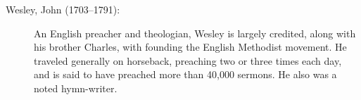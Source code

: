 \documentclass[00-main.tex]{subfiles}
\begin{document}
\begin{description}
	\item[Wesley, John (1703--1791):]\label{wesley} An English preacher and theologian, Wesley is largely credited, along with his brother Charles, with founding the English Methodist movement. He traveled generally on horseback, preaching two or three times each day, and is said to have preached more than 40,000 sermons. He also was a noted hymn-writer.
	
\end{description}
\end{document}
